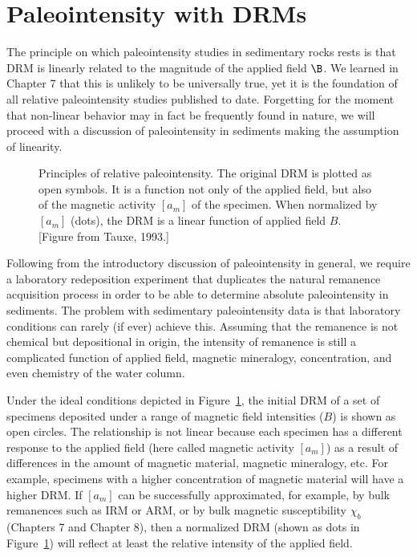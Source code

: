 \section{Paleointensity with DRMs}
\label{sect:drmint}

The principle on which paleointensity studies in sedimentary rocks rests is
that DRM is linearly related to the magnitude of the
applied field $\B$.   We learned in Chapter 7  that this is  unlikely to be universally true, yet it is the foundation  of all relative paleointensity studies published to date.  
Forgetting for the moment that non-linear behavior may in fact be frequently found in nature, we will proceed with a discussion of paleointensity in sediments making the assumption of linearity.  

\begin{figure}[htb]
\epsfxsize 10cm
\centering {}
\caption{Principles of relative paleointensity.  The original DRM is plotted
as open symbols.  It is a function not only of the applied field, but
also of the magnetic activity $[a_m]$ of the specimen.  When normalized by
$[a_m]$ (dots), the DRM is a linear function of applied field $B$.  [Figure from Tauxe, 1993.] }
\label{fig:drm}
\end{figure}
\nocite{tauxe93}



Following from the introductory discussion of paleointensity in general, we require a laboratory redeposition experiment that duplicates the natural remanence acquisition process in order to be able to determine absolute paleointensity in  sediments.  
The problem with sedimentary paleointensity data is that laboratory
conditions can rarely (if ever) achieve this.  Assuming that the remanence is not chemical but depositional in origin,
  the intensity of remanence is still a complicated  function
  of applied  field, magnetic mineralogy, concentration,  and even chemistry of the water column.

Under the ideal conditions depicted in Figure~\ref{fig:drm}, the initial
DRM of a set of specimens deposited under a range of magnetic field
intensities ($B$) is shown as open circles.  The
relationship is not linear because each specimen has a different 
response   to the applied field (here called 
magnetic activity $[a_m]$) as a result of differences in
the amount of magnetic material, magnetic mineralogy, etc.
For example, specimens with a higher concentration of magnetic
material will have a higher DRM.  If $[a_m]$ can be successfully
approximated, for example, by bulk remanences such as IRM or ARM,
or by bulk magnetic susceptibility $\chi_b$ (Chapters  7 and Chapter 8), then a
normalized DRM (shown as dots in Figure~\ref{fig:drm}) will reflect at least  the
relative intensity of the applied field. 


